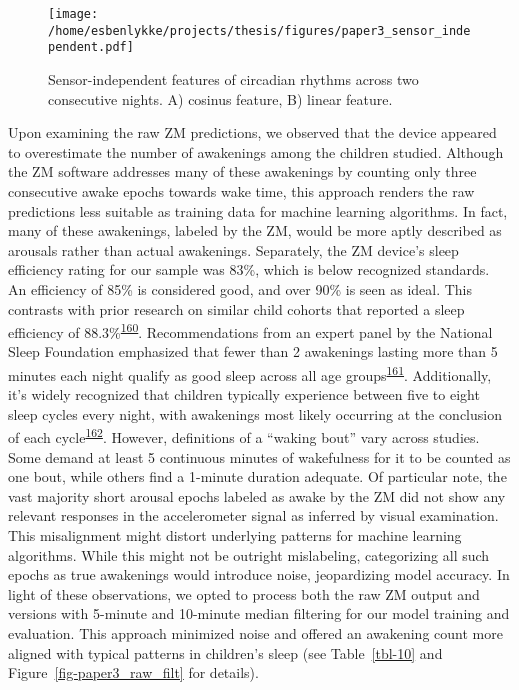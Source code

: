 \documentclass[
  10pt,
]{scrbook}
\begin{document}
\endgroup

\begin{figure}

{\centering \texttt{[image: /home/esbenlykke/projects/thesis/figures/paper3\_sensor\_independent.pdf]}

}

\caption{\label{fig-paper3_sensor_independent}Sensor-independent
features of circadian rhythms across two consecutive nights. A) cosinus
feature, B) linear feature.}

\end{figure}

Upon examining the raw ZM predictions, we observed that the device
appeared to overestimate the number of awakenings among the children
studied. Although the ZM software addresses many of these awakenings by
counting only three consecutive awake epochs towards wake time, this
approach renders the raw predictions less suitable as training data for
machine learning algorithms. In fact, many of these awakenings, labeled
by the ZM, would be more aptly described as arousals rather than actual
awakenings. Separately, the ZM device's sleep efficiency rating for our
sample was 83\%, which is below recognized standards. An efficiency of
85\% is considered good, and over 90\% is seen as ideal. This contrasts
with prior research on similar child cohorts that reported a sleep
efficiency of
88.3\%\textsuperscript{\protect\hyperlink{ref-galland_2018}{160}}.
Recommendations from an expert panel by the National Sleep Foundation
emphasized that fewer than 2 awakenings lasting more than 5 minutes each
night qualify as good sleep across all age
groups\textsuperscript{\protect\hyperlink{ref-ohayon_2017}{161}}.
Additionally, it's widely recognized that children typically experience
between five to eight sleep cycles every night, with awakenings most
likely occurring at the conclusion of each
cycle\textsuperscript{\protect\hyperlink{ref-galland_normal_2012}{162}}.
However, definitions of a ``waking bout'' vary across studies. Some
demand at least 5 continuous minutes of wakefulness for it to be counted
as one bout, while others find a 1-minute duration adequate. Of
particular note, the vast majority short arousal epochs labeled as awake
by the ZM did not show any relevant responses in the accelerometer
signal as inferred by visual examination. This misalignment might
distort underlying patterns for machine learning algorithms. While this
might not be outright mislabeling, categorizing all such epochs as true
awakenings would introduce noise, jeopardizing model accuracy. In light
of these observations, we opted to process both the raw ZM output and
versions with 5-minute and 10-minute median filtering for our model
training and evaluation. This approach minimized noise and offered an
awakening count more aligned with typical patterns in children's sleep
(see Table~\ref{tbl-10} and Figure~\ref{fig-paper3_raw_filt} for
details).
\end{document}

